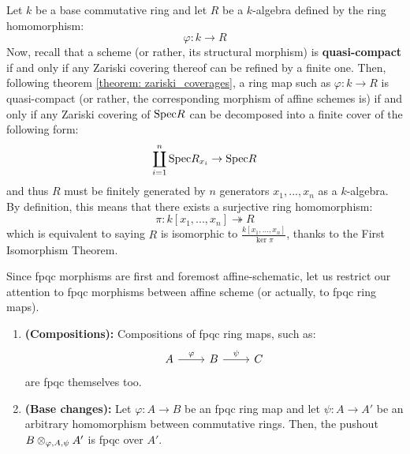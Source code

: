                     \begin{remark} \label{remark: quasi_compact_affine_schematic_morphisms} 
                        Let $k$ be a base commutative ring and let $R$ be a $k$-algebra defined by the ring homomorphism:
                            $$\varphi: k \to R$$
                        Now, recall that a scheme (or rather, its structural morphism) is \textbf{quasi-compact} if and only if any Zariski covering thereof can be refined by a finite one. Then, following theorem \ref{theorem: zariski_coverages}, a ring map such as $\varphi: k \to R$ is quasi-compact (or rather, the corresponding morphism of affine schemes is) if and only if any Zariski covering of $\mathrm{Spec} R$ can be decomposed into a finite cover of the following form:
                            $$\coprod_{i = 1}^n \mathrm{Spec} R_{x_i} \to \mathrm{Spec} R$$
                        and thus $R$ must be finitely generated by $n$ generators $x_1, ..., x_n$ as a $k$-algebra. By definition, this means that there exists a surjective ring homomorphism:
                            $$\pi: k[x_1, ..., x_n] \twoheadrightarrow R$$
                        which is equivalent to saying $R$ is isomorphic to $\frac{k[x_1, ..., x_n]}{\ker \pi}$, thanks to the First Isomorphism Theorem. 
                    \end{remark}
                    \begin{lemma} \label{lemma: fpqc_compositions_and_base_changes}
                        Since fpqc morphisms are first and foremost affine-schematic, let us restrict our attention to fpqc morphisms between affine scheme (or actually, to fpqc ring maps).
                        \begin{enumerate}
                            \item \textbf{(Compositions):} Compositions of fpqc ring maps, such as:
                                $$
                                    \begin{tikzcd}
                                    	A & B & C
                                    	\arrow["\varphi", from=1-1, to=1-2]
                                    	\arrow["\psi", from=1-2, to=1-3]
                                    \end{tikzcd}
                                $$
                            are fpqc themselves too.
                            \item \textbf{(Base changes):} Let $\varphi: A \to B$ be an fpqc ring map and let $\psi: A \to A'$ be an arbitrary homomorphism between commutative rings. Then, the pushout $B \tensor_{\varphi, A, \psi} A'$ is fpqc over $A'$.  
                        \end{enumerate}
                    \end{lemma}
